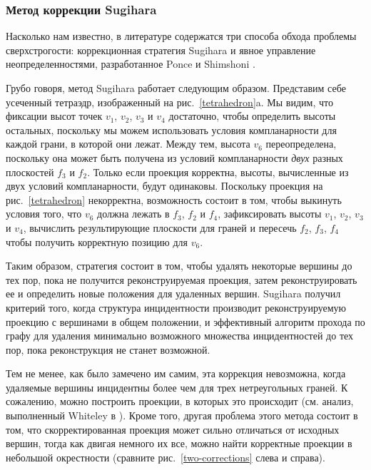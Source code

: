 \documentclass[a4paper,12pt, titlepage]{article}
\begin{document}
\subsubsection{Метод коррекции Sugihara}

\begin{flushleft}
      Насколько нам известно, в литературе содержатся три способа обхода проблемы сверхстрогости:
коррекционная стратегия Sugihara \cite{Sugihara-MILD} и явное управление неопределенностями, 
разработанное Ponce и Shimshoni \cite{Ponce-Shimshoni, Shimshoni}.
\end{flushleft}

\begin{flushleft}
      Грубо говоря, метод Sugihara работает следующим образом. Представим себе усеченный тетраэдр,
изображенный на рис.~\ref{tetrahedron}a. Мы видим, что фиксации высот точек $v_{1}$, $v_{2}$,
$v_{3}$ и $v_{4}$ достаточно, чтобы определить высоты остальных, поскольку мы можем использовать
условия компланарности для каждой грани, в которой они лежат. Между тем, высота $v_{6}$ переопределена,
поскольку она может быть получена из условий компланарности \textit{двух} разных плоскостей $f_{3}$
и $f_{2}$. Только если проекция корректна, высоты, вычисленные из двух условий компланарности,
будут одинаковы. Поскольку проекция на рис.~\ref{tetrahedron} некорректна, возможность состоит в том,
чтобы выкинуть условия того, что $v_{6}$ должна лежать в $f_{3}$, $f_{2}$ и $f_{4}$,
зафиксировать высоты $v_{1}$, $v_{2}$, $v_{3}$ и $v_{4}$, вычислить результирующие плоскости для 
граней и пересечь $f_{2}$, $f_{3}$, $f_{4}$ чтобы получить корректную позицию для $v_{6}$.
\end{flushleft}

\begin{flushleft}
      Таким образом, стратегия состоит в том, чтобы удалять некоторые вершины до тех пор,
пока не получится реконструируемая проекция, затем реконструировать ее и определить новые положения
для удаленных вершин. Sugihara получил критерий того, когда структура инцидентности производит
реконструируемую проекцию с вершинами в общем положении, и эффективный алгоритм прохода по графу
для удаления минимально возможного множества инцидентностей до тех пор, пока реконструкция не станет
возможной.
\end{flushleft}

\begin{flushleft}
      Тем не менее, как было замечено им самим, эта коррекция невозможна, когда удаляемые вершины 
инцидентны более чем для трех нетреугольных граней. К сожалению, можно построить проекции, в которых
это происходит (см. анализ, выполненный Whiteley в \cite{Whiteley-1}). Кроме того, другая проблема
этого метода состоит в том, что скорректированная проекция может сильно отличаться от исходных
вершин, тогда как двигая немного их все, можно найти корректные проекции в небольшой окрестности 
(сравните рис.~\ref{two-corrections} слева и справа).
\end{flushleft}
\end{document}
